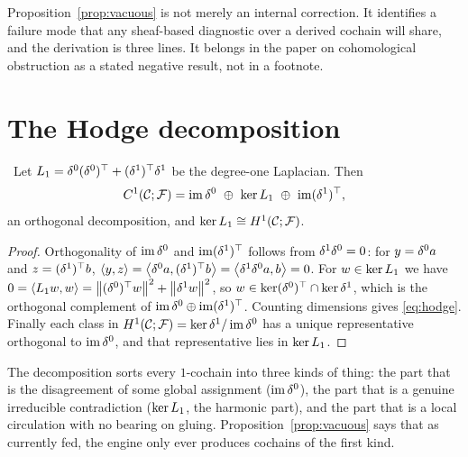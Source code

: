 \begin{remark}
Proposition~\ref{prop:vacuous} is not merely an internal correction. It
identifies a failure mode that any sheaf-based diagnostic over a derived
cochain will share, and the derivation is three lines. It belongs in
the paper on cohomological obstruction as a stated negative result,
not in a footnote.
\end{remark}

\section{The Hodge decomposition}

\begin{theorem}\label{thm:hodge}
\Proved\ Let $L_{1}=\delta^0(\delta^0)^\top+(\delta^1)^\top\delta^1$ be the
degree-one Laplacian. Then
\begin{equation}\label{eq:hodge}
  \Cone=\im\cob^0\ \oplus\ \ker\Lapk{1}\ \oplus\ \im(\cob^1)^\top,
\end{equation}
an orthogonal decomposition, and $\ker L_{1}\cong H^{1}(\mathcal{C};\mathcal{F})$.
\end{theorem}
\begin{proof}
Orthogonality of $\operatorname{im}\delta^0$ and $\operatorname{im}(\delta^1)^\top$ follows from
$\delta^1\delta^0=0$: for $y=\delta^0a$ and $z=(\delta^1)^\top b$,
$\left\langle y,z\right\rangle=\left\langle \delta^0a,(\delta^1)^\top b\right\rangle
=\left\langle \delta^1\delta^0a,b\right\rangle=0$.
For $w\in\ker L_{1}$ we have
$0=\left\langle L_{1}w,w\right\rangle=\left\lVert (\delta^0)^\top w \right\rVert^2+\left\lVert \delta^1w \right\rVert^2$, so
$w\in\ker(\delta^0)^\top\cap\ker\delta^1$, which is the orthogonal
complement of $\operatorname{im}\delta^0\oplus\operatorname{im}(\delta^1)^\top$. Counting dimensions
gives \eqref{eq:hodge}. Finally each class in
$H^{1}(\mathcal{C};\mathcal{F})=\ker\delta^1/\operatorname{im}\delta^0$ has a unique representative orthogonal to
$\operatorname{im}\delta^0$, and that representative lies in $\ker L_{1}$.
\end{proof}

\begin{intu}\Intu
The decomposition sorts every $1$-cochain into three kinds of thing:
the part that is the disagreement of some global assignment
($\operatorname{im}\delta^0$), the part that is a genuine irreducible contradiction
($\ker L_{1}$, the harmonic part), and the part that is a local
circulation with no bearing on gluing. Proposition~\ref{prop:vacuous}
says that as currently fed, the engine only ever produces cochains of
the first kind.
\end{intu}

